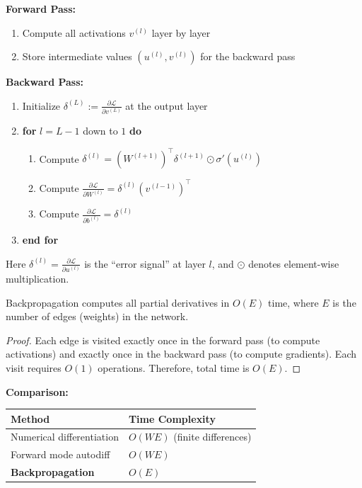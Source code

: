 \documentclass[main.tex]{subfiles}
\begin{document}
\begin{algorithm}[Backpropagation]
\textbf{Forward Pass:}
\begin{enumerate}
    \item Compute all activations $v^{(l)}$ layer by layer
    \item Store intermediate values $(u^{(l)}, v^{(l)})$ for the backward pass
\end{enumerate}

\textbf{Backward Pass:}
\begin{enumerate}
    \item Initialize $\delta^{(L)} := \frac{\partial \mathcal{L}}{\partial v^{(L)}}$ at the output layer
    \item \textbf{for} $l = L-1$ down to $1$ \textbf{do}
    \begin{enumerate}
        \item Compute $\delta^{(l)} = (W^{(l+1)})^\top \delta^{(l+1)} \odot \sigma'(u^{(l)})$
        \item Compute $\frac{\partial \mathcal{L}}{\partial W^{(l)}} = \delta^{(l)} (v^{(l-1)})^\top$
        \item Compute $\frac{\partial \mathcal{L}}{\partial b^{(l)}} = \delta^{(l)}$
    \end{enumerate}
    \item \textbf{end for}
\end{enumerate}
\end{algorithm}

Here $\delta^{(l)} = \frac{\partial \mathcal{L}}{\partial u^{(l)}}$ is the ``error signal'' at layer $l$, and $\odot$ denotes element-wise multiplication.

\begin{theorem}
Backpropagation computes all partial derivatives in $O(E)$ time, where $E$ is the number of edges (weights) in the network.
\end{theorem}

\begin{proof}
Each edge is visited exactly once in the forward pass (to compute activations) and exactly once in the backward pass (to compute gradients). Each visit requires $O(1)$ operations. Therefore, total time is $O(E)$.
\end{proof}

\textbf{Comparison:}
\begin{center}
\begin{tabular}{ll}
\hline
\textbf{Method} & \textbf{Time Complexity} \\
\hline
Numerical differentiation & $O(WE)$ (finite differences) \\
Forward mode autodiff & $O(WE)$ \\
\textbf{Backpropagation} & $O(E)$ \\
\hline
\end{tabular}
\end{center}
\end{document}
